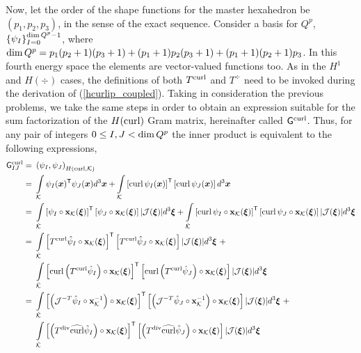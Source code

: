 Now, let the order of the shape functions for the master hexahedron be $(p_1,p_2,p_3)$, in the sense of the exact sequence. Consider a basis for $Q^p$, $\left\{ \psi_I \right\}_{I=0}^{\operatorname*{dim} Q^p-1}$, where $\operatorname*{dim} Q^p=p_1(p_2+1)(p_3+1)+(p_1+1)p_2(p_3+1)+(p_1+1)(p_2+1)p_3$. In this fourth energy space the elements are vector-valued functions too. As in the $H^1$ and $H(\div)$ cases, the definitions of both $T^{\operatorname{curl}}$ and $T^{\div}$ need to be invoked during the derivation of (\ref{hcurlip_coupled}). Taking in consideration the previous problems, we take the same steps in order to obtain an expression suitable for the sum factorization of the $H(\operatorname{curl})$ Gram matrix, hereinafter called $\mathsf{G}^{\operatorname{curl}}$. Thus, for any pair of integers $0\leq I,J<\operatorname*{dim} Q^p$ the inner product is equivalent to the following expressions,
%
\begin{align}
\sfG^{\curl}_{IJ}  =\ &\left( \psi_I, \psi_J\right)_{\HSo(\curl,\mcK)} \nonumber\\
                \ =\ & \int\limits_{\mcK} \psi_I(\bsx)^\T \psi_J(\bsx)d^3\bsx + \int\limits_{\mcK}\left[\curl \psi_I(\bsx)\right]^\T\left[\curl \psi_J(\bsx)\right]d^3\bsx \nonumber\\ 
                \ =\ & \int\limits_{\hatK}\left[ \psi_I\circ\bfx_\mcK(\bsxi)\right]^\T\left[ \psi_J\circ\bfx_\mcK(\bsxi)\right]|\mcJ(\bsxi)|d^3\bsxi +
                \int\limits_{\hatK}\left[\curl \psi_I\circ\bfx_\mcK(\bsxi)\right]^\T\left[\curl \psi_J\circ\bfx_\mcK(\bsxi)\right]|\mcJ(\bsxi)|d^3\bsxi \nonumber\\ 
                \ =\ & \int\limits_{\hatK}
                \left[ T^{\curl}\hat{ \psi}_I\circ\bfx_\mcK(\bsxi)\right]^\T\left[ T^{\curl}\hat{ \psi}_J\circ\bfx_\mcK(\bsxi)\right]|\mcJ(\bsxi)|d^3\bsxi \ +\nonumber\\*
                \ & \int\limits_{\hatK}
                \left[\curl\left( T^{\curl}\hat{ \psi}_I\right)\circ\bfx_\mcK(\bsxi)\right]^\T\left[\curl \left( T^{\curl}\hat{ \psi}_J\right)\circ\bfx_\mcK(\bsxi)\right]|\mcJ(\bsxi)|d^3\bsxi \nonumber\\ 
                =\ & \int\limits_{\hatK}
                \left[\left(\mcJ^{-T}\hat{ \psi}_I\circ\bfx_\mcK^{-1}\right)\circ\bfx_\mcK(\bsxi)\right]^\T \left[\left(\mcJ^{-T}\hat{ \psi}_J\circ\bfx_\mcK^{-1}\right)\circ\bfx_\mcK(\bsxi)\right]|\mcJ(\bsxi)|d^3\bsxi \ +\nonumber\\*
                \ & \int\limits_{\hatK}
                \left[\left(T^{\div}\widehat{\curl}\hat{ \psi}_I\right)\circ\bfx_\mcK(\bsxi)\right]^\T \left[\left(T^{\div}\widehat{\curl}\hat{ \psi}_J\right)\circ\bfx_\mcK(\bsxi)\right]|\mcJ(\bsxi)|d^3\bsxi \nonumber\\ 

\end{align}
